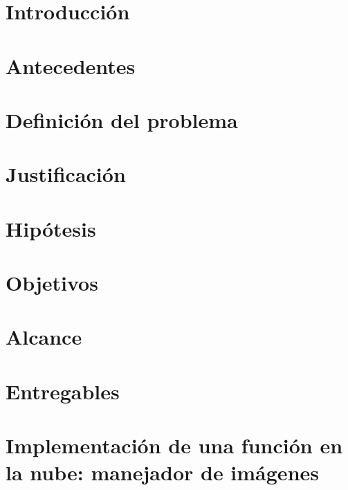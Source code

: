 \documentclass[12pt, twoside]{report}
\begin{document}
\tableofcontents
\listoffigures
\listoftables
\listofalgorithms

\printglossary[type=\acronymtype, title=Acrónimos]

\printglossaries

\chapter{Introducción}


\chapter{Antecedentes}
\label{cap:antecedentes}


\chapter{Definición del problema}
\label{cap:problema}


\chapter{Justificación}
\label{cap:justificacion}


\chapter{Hipótesis}
\label{cap:hipotesis}


\chapter{Objetivos}
\label{cap:objetivos}


\chapter{Alcance}
\label{cap:alcance}


\chapter{Entregables}
\label{cap:entregables}


\chapter[Implementación de una \emph{FaaS}: manejador de imágnenes]{Implementación de una función en la nube: manejador de imágenes}
\label{cap:manejador-imagenes}

\end{document}
